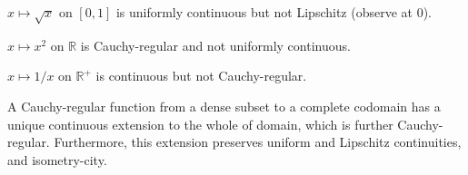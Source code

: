 	\begin{rmk}
		\begin{mylist}
			\item $x\mapsto \sqrt x$ on $[0, 1]$ is uniformly continuous but not Lipschitz (observe at $0$).
			
			\item $x\mapsto x^2$ on $\mathbb R$ is Cauchy-regular and not uniformly continuous.
			
			\item $x\mapsto 1/x$ on $\mathbb R^+$ is continuous but not Cauchy-regular.
		\end{mylist}
	\end{rmk}
	
	
	\begin{thm}\label{THM: extension of Chauchy-regs}
		A Cauchy-regular function from a dense subset to a complete codomain has a unique continuous extension to the whole of domain, which is further Cauchy-regular. Furthermore, this extension preserves uniform and Lipschitz continuities, and isometry-city.
	\end{thm}
	
